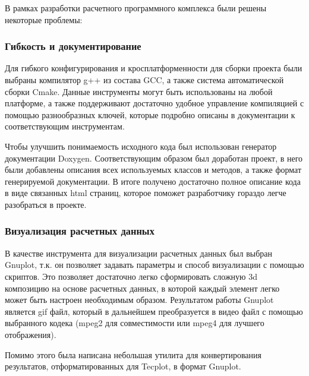 В рамках разработки расчетного программного комплекса были решены некоторые проблемы:

\addtocounter{subsubsection}{1}
\subsubsection*{Гибкость и документирование}

Для гибкого конфигурирования и кросплатформенности для сборки проекта были выбраны компилятор g++ из состава GCC, а также система автоматической сборки Cmake. Данные инструменты могут быть использованы на любой платформе, а также поддерживают достаточно удобное управление компиляцией с помощью разнообразных ключей, которые подробно описаны в документации к соответствующим инструментам.

Чтобы улучшить понимаемость исходного кода был использован генератор документации Doxygen. Соответствующим образом был доработан проект, в него были добавлены описания всех используемых классов и методов, а также формат генерируемой документации. В итоге получено достаточно полное описание кода в виде связанных html страниц, которое поможет разработчику гораздо легче разобраться в проекте.

\addtocounter{subsubsection}{1}
\subsubsection*{Визуализация расчетных данных}

В качестве инструмента для визуализации расчетных данных был выбран Gnuplot, т.к. он позволяет задавать параметры и способ визуализации с помощью скриптов. Это позволяет достаточно легко сформировать сложную 3d композицию на основе расчетных данных, в которой каждый элемент легко может быть настроен необходимым образом. Результатом работы Gnuplot является gif файл, который в дальнейшем преобразуется в видео файл с помощью выбранного кодека (mpeg2 для совместимости или mpeg4 для лучшего отображения).

Помимо этого была написана небольшая утилита для конвертирования результатов, отформатированных для Tecplot, в формат Gnuplot.

